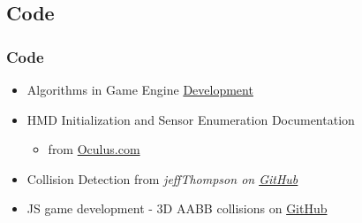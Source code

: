 \documentclass{beamer}
\begin{document}
\subsection{Code}
	\begin{frame}
	\frametitle{Code}
	\begin{itemize}
		\item Algorithms in Game Engine \href{http://www.haroldserrano.com/blog/algorithms-in-game-engine-development}{Development}
		\item HMD Initialization and Sensor Enumeration Documentation
			\begin{itemize}
				\item from \href{https://developer3.oculus.com/documentation/pcsdk/latest/concepts/dg-sensor/}{Oculus.com}
			\end{itemize}
		\item Collision Detection from \it{jeffThompson} on \href{https://github.com/jeffThompson/CollisionDetection}{GitHub}
		\item JS game development - 3D AABB collisions on \href{https://github.com/mozdevs/gamedev-js-3d-aabb}{GitHub}
	\end{itemize}
	\end{frame}
\end{document}
